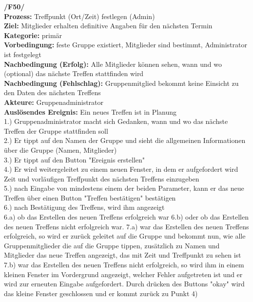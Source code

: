 \textbf{/F50/} \\
\textbf{Prozess:} Treffpunkt (Ort/Zeit) festlegen (Admin)\\
\textbf{Ziel:} Mitglieder erhalten definitive Angaben für den nächsten Termin\\
\textbf{Kategorie:} primär\\
\textbf{Vorbedingung:} feste Gruppe existiert, Mitglieder sind bestimmt, Administrator ist festgelegt\\
\textbf{Nachbedingung (Erfolg):} Alle Mitglieder können sehen, wann und wo (optional) das nächste Treffen stattfinden wird\\
\textbf{Nachbedingung (Fehlschlag):} Gruppenmitglied bekommt keine Einsicht zu den Daten des nächsten Treffens\\
\textbf{Akteure:} Gruppenadministrator\\
\textbf{Auslösendes Ereignis:} Ein neues Treffen ist in Planung\\
1.) Gruppenadministrator macht sich Gedanken, wann und wo das nächste Treffen der Gruppe stattfinden soll\\
2.) Er tippt auf den Namen der Gruppe und sieht die allgemeinen Informationen über die Gruppe (Namen, Mitglieder)\\
3.) Er tippt auf den Button "Ereignis erstellen"\\
4.) Er wird weitergeleitet zu einem neuen Fenster, in dem er aufgefordert wird Zeit und vorläufigen Treffpunkt des nächsten Treffens einzugeben\\
5.) nach Eingabe von mindestens einem der beiden Parameter, kann er das neue Treffen über einen Button "Treffen bestätigen" bestätigen\\
6.) nach Bestätigung des Treffens, wird ihm angezeigt\\
6.a) ob das Erstellen des neuen Treffens erfolgreich war
6.b) oder ob das Erstellen des neuen Treffens nicht erfolgreich war.
7.a) war das Erstellen des neuen Treffens erfolgreich, so wird er zurück geleitet auf die Gruppe und bekommt nun, wie alle Gruppenmitglieder die auf die Gruppe tippen, zusätzlich zu Namen und Mitglieder das neue Treffen angezeigt, das mit Zeit und Treffpunkt zu sehen ist\\
7.b) war das Erstellen des neuen Treffens nicht erfolgreich, so wird ihm in einem kleinen Fenster im Vordergrund angezeigt, welcher Fehler aufgetreten ist und er wird zur erneuten Eingabe aufgefordert. Durch drücken des Buttons "okay" wird das kleine Fenster geschlossen und er kommt zurück zu Punkt 4)\\ \\


